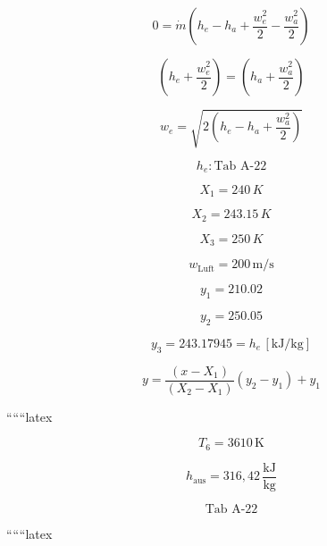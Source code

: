 \[
0 = \dot{m} \left( h_e - h_a + \frac{w_e^2}{2} - \frac{w_a^2}{2} \right)
\]

\[
\left( h_e + \frac{w_e^2}{2} \right) = \left( h_a + \frac{w_a^2}{2} \right)
\]

\[
w_e = \sqrt{2 \left( h_e - h_a + \frac{w_a^2}{2} \right)}
\]

\[
h_e: \text{Tab A-22}
\]

\[
X_1 = 240 \, K
\]

\[
X_2 = 243.15 \, K
\]

\[
X_3 = 250 \, K
\]

\[
w_{\text{Luft}} = 200 \, \text{m/s}
\]

\[
y_1 = 210.02
\]

\[
y_2 = 250.05
\]

\[
y_3 = 243.17945 = h_e \, [\text{kJ/kg}]
\]

\[
y = \frac{(x - X_1)}{(X_2 - X_1)} (y_2 - y_1) + y_1
\]

``````latex


\[
T_6 = 3610 \, \text{K}
\]

\[
h_{\text{aus}} = 316,42 \, \frac{\text{kJ}}{\text{kg}}
\]

\[
\text{Tab A-22}
\]

``````latex


